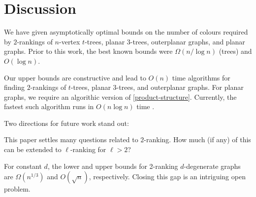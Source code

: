 \documentclass[kpfonts]{patmorin}
\DeclareMathOperator{\pw}{pw}
\theoremstyle{named}
\begin{document}
%
%
%
%
%
%


\section{Discussion}
\label{conclusion}

We have given asymptotically optimal bounds on the number of colours required by $2$-rankings of $n$-vertex $t$-trees, planar 3-trees, outerplanar graphs, and planar graphs.  Prior to this work, the best known bounds were $\Omega(n/\log n)$ (trees) and $O(\log n)$.

Our upper bounds are constructive and lead to $O(n)$ time algorithms for finding $2$-rankings of $t$-trees, planar 3-trees, and outerplanar graphs.  For planar graphs, we require an algorithic version of \cref{product-structure}. Currently, the fastest such algorithm runs in $O(n\log n)$ time \cite{morin:fast}.

Two directions for future work stand out:
\begin{inparaenum}[(i)]
    \item This paper settles many questions related to $2$-ranking.  How much (if any) of this can be extended to $\ell$-ranking for $\ell>2$?
    \item For constant $d$, the lower and upper bounds for 2-ranking $d$-degenerate graphs are $\Omega(n^{1/3})$ and $O(\sqrt{n})$, respectively.  Closing this gap is an intriguing open problem.
\end{inparaenum}
\end{document}

